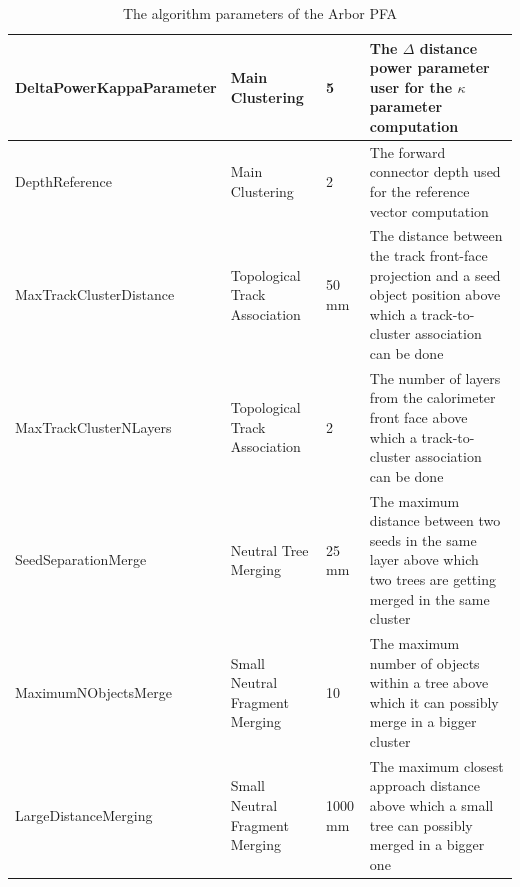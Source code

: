 \documentclass[cits]{JINST}
\begin{document}
\begin{center}
  \begin{table}[!ht]
    \begin{tabu} to \linewidth {| l | X | l | X |}
          \hline
          DeltaPowerKappaParameter & Main Clustering & 5 & The $\Delta$ distance power parameter user for the $\kappa$ parameter computation \\
          \hline
          DepthReference & Main Clustering & 2 & The forward connector depth used for the reference vector computation \\
          \hline
          MaxTrackClusterDistance & Topological Track Association & 50 mm & The distance between the track front-face projection and a seed object position above which a track-to-cluster association can be done \\
          \hline
          MaxTrackClusterNLayers & Topological Track Association & 2 & The number of layers from the calorimeter front face above which a track-to-cluster association can be done \\ 
          \hline
          SeedSeparationMerge & Neutral Tree Merging & 25 mm & The maximum distance between two seeds in the same layer above which two trees are getting merged in the same cluster \\ 
          \hline
          MaximumNObjectsMerge & Small Neutral Fragment Merging & 10 & The maximum number of objects within a tree above which it can possibly merge in a bigger cluster \\
          \hline
          LargeDistanceMerging & Small Neutral Fragment Merging & 1000 mm & The maximum closest approach distance above which a small tree can possibly merged in a bigger one \\
          \hline
          
    \end{tabu}
  \caption{The algorithm parameters of the Arbor PFA}
  \end{table}
\end{center}
\end{document}
